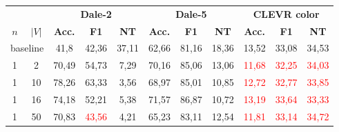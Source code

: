 \begin{table}[ht]
    \centering
    \begin{tabular}{cc|ccc|ccc|ccc}
        \toprule
                                      &        & \multicolumn{3}{c}{\textbf{Dale-2}} & \multicolumn{3}{c}{\textbf{Dale-5}} & \multicolumn{3}{c}{\textbf{CLEVR color}}                                                                                                                                                       \\  \cmidrule(lr){3-5}\cmidrule(lr){6-8}\cmidrule(lr){9-11}
        $n$                           & $|V|$  & \textbf{Acc.}                       & \textbf{F1}                         & \textbf{NT}                              & \textbf{Acc.}          & \textbf{F1}            & \textbf{NT}            & \textbf{Acc.}          & \textbf{F1}            & \textbf{NT}            \\\midrule
        \multicolumn{2}{c|}{baseline} & {41,8} & {42,36}                             & {37,11}                             & {62,66}                                  & {81,16}                & {18,36}                & {13,52}                & {33,08}                & {34,53}                                         \\\midrule
        {1}                           & {2}    & {70,49}                             & {54,73}                             & {7,29}                                   & {70,16}                & {85,06}                & {13,06}                & \textcolor{red}{11,68} & \textcolor{red}{32,25} & \textcolor{red}{34,03} \\
        {1}                           & {10}   & {78,26}                             & {63,33}                             & {3,56}                                   & {68,97}                & {85,01}                & {10,85}                & \textcolor{red}{12,72} & \textcolor{red}{32,77} & \textcolor{red}{33,85} \\
        {1}                           & {16}   & {74,18}                             & {52,21}                             & {5,38}                                   & {71,57}                & {86,87}                & {10,72}                & \textcolor{red}{13,19} & \textcolor{red}{33,64} & \textcolor{red}{33,33} \\
        {1}                           & {50}   & {70,83}                             & \textcolor{red}{43,56}              & {4,21}                                   & {65,23}                & {83,11}                & {12,54}                & \textcolor{red}{11,81} & \textcolor{red}{33,14} & \textcolor{red}{34,72} \\

\end{tabular}
\end{table}
